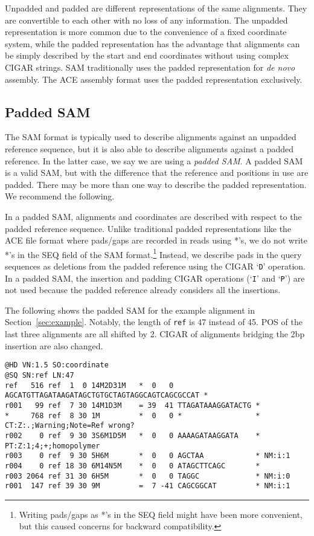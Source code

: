 \documentclass[10pt]{article}
\begin{document}
Unpadded and padded are different representations of the same alignments. They
are convertible to each other with no loss of any information. The unpadded
representation is more common due to the convenience of a fixed coordinate system,
while the padded representation has the advantage that alignments can be simply
described by the start and end coordinates without using complex CIGAR strings.
SAM traditionally uses the padded representation for {\it de novo} assembly.
The ACE assembly format uses the padded representation exclusively.

\subsection{Padded SAM}\label{sec:padded-sam}

The SAM format is typically used to describe alignments against an unpadded
reference sequence, but it is also able to describe alignments against a padded
reference. In the latter case, we say we are using a \emph{padded SAM}. A padded
SAM is a valid SAM, but with the difference that the reference and positions in
use are padded. There may be more than one way to describe the padded
representation. We recommend the following.

In a padded SAM, alignments and coordinates are described with respect to the
padded reference sequence. Unlike traditional padded representations like
the ACE file format where pads/gaps are recorded in reads using *'s, we do
not write *'s in the {\sf SEQ} field of the SAM format.\footnote{Writing
pads/gaps as *'s in the {\sf SEQ} field might have been more convenient, but
this caused concerns for backward compatibility.} Instead, we describe pads
in the query sequences as deletions from the padded reference using the
{\sf CIGAR} `{\tt D}' operation. In a padded SAM, the insertion and padding
CIGAR operations (`{\tt I}' and `{\tt P}') are not used because the padded
reference already considers all the insertions.

The following shows the padded SAM for the example alignment in Section~\ref{sec:example}.
Notably, the length of {\tt ref} is 47 instead of 45. {\sf POS} of the last
three alignments are all shifted by 2. {\sf CIGAR} of alignments bridging the
2bp insertion are also changed.

\begin{framed}\small
\begin{verbatim}
@HD VN:1.5 SO:coordinate
@SQ SN:ref LN:47
ref   516 ref  1  0 14M2D31M   *  0   0 AGCATGTTAGATAAGATAGCTGTGCTAGTAGGCAGTCAGCGCCAT *
r001   99 ref  7 30 14M1D3M    = 39  41 TTAGATAAAGGATACTG *
*     768 ref  8 30 1M         *  0   0 *                 * CT:Z:.;Warning;Note=Ref wrong?
r002    0 ref  9 30 3S6M1D5M   *  0   0 AAAAGATAAGGATA    * PT:Z:1;4;+;homopolymer
r003    0 ref  9 30 5H6M       *  0   0 AGCTAA            * NM:i:1
r004    0 ref 18 30 6M14N5M    *  0   0 ATAGCTTCAGC       *
r003 2064 ref 31 30 6H5M       *  0   0 TAGGC             * NM:i:0
r001  147 ref 39 30 9M         =  7 -41 CAGCGGCAT         * NM:i:1
\end{verbatim}
\end{framed}
\end{document}
